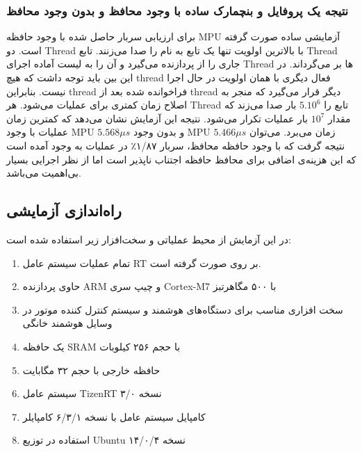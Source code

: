 \documentclass[10pt, a4paper]{article}
\begin{document}
\subsubsection{نتیجه یک پروفایل و بنچمارک ساده با وجود محافظ و بدون وجود محافظ}

برای ارزیابی سربار حاصل شده با وجود حافظه MPU آزمایشی ساده صورت گرفته است. دو
Thread با بالاترین اولویت تنها یک تابع به نام  را صدا
می‌زنند. تابع  Thread جاری را از پردازنده می‌گیرد و آن را به
لیست آماده اجرای Thread ها بر می‌گرداند. در این بین باید توجه داشت که هیچ thread
فعال دیگری با همان اولویت در حال اجرا نیست.  بنابراین thread فراخوانده شده بعد
از thread دیگر قرار می‌گیرد که منجر به اصلاح زمان کمتری برای عملیات  می‌شود. هر Thread تابع  را $5.10^6$ بار صدا می‌زند
که مقدار $10^7$ بار عملیات  تکرار می‌شود. نتیجه این آزمایش
نشان می‌دهد که کمترین زمان عملیات  با وجود MPU $5.568\mu s$ و
بدون وجود MPU $5.466\mu s$ زمان می‌برد. می‌توان نتیجه گرفت که با وجود حافظه محافظ،
سربار ۱/۸۷٪ در عملیات  به وجود آمده است که این هزینه‌ی
اضافی برای محافظ حافظه اجتناب ناپذیر است اما از نظر اجرایی بسیار بی‌اهمیت
می‌باشد.

\subsection{راه‌اندازی آزمایشی}

در این آزمایش از محیط عملیاتی و سخت‌افزار زیر استفاده شده است:

\begin{enumerate}
    \item تمام عملیات سیستم عامل RT بر روی 
    \cite{armnxpimxrt1020} صورت گرفته است.
    \item حاوی پردازنده ARM و چیپ سری Cortex-M7 با ۵۰۰ مگاهرتبز
    \item سخت افزاری مناسب برای دستگاه‌های هوشمند و سیستم کنترل کننده موتور در
    وسایل هوشمند خانگی
    \item یک حافظه SRAM با حجم ۲۵۶ کیلوبات
    \item حافظه خارجی با حجم ۳۲ مگابایت 
    \item سیستم عامل TizenRT نسخه ۳/۰ \cite{tizenrtrepo}
    \item کامپایل سیستم عامل با نسخه ۶/۳/۱ کامپایلر 
    \item استفاده در توزیع Ubuntu نسخه ۱۴/۰/۴
\end{enumerate}
\end{document}
